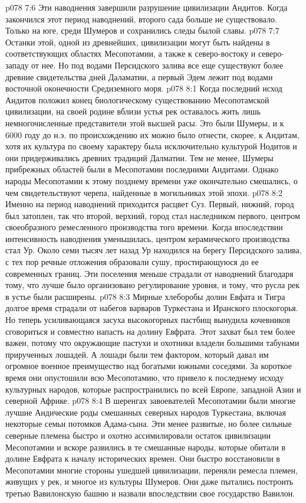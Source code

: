 \vs p078 7:6 \pc Эти наводнения завершили разрушение цивилизации Андитов. Когда закончился этот период наводнений, второго сада больше не существовало. Только на юге, среди Шумеров и сохранились следы былой славы.
\vs p078 7:7 Останки этой, одной из древнейших, цивилизации могут быть найдены в соответствующих областях Месопотамии, а также к северо\hyp{}востоку и северо\hyp{}западу от нее. Но под водами Персидского залива все еще существуют более древние свидетельства дней Даламатии, а первый Эдем лежит под водами восточной оконечности Средиземного моря.
\vs p078 8:1 Когда последний исход Андитов положил конец биологическому существованию Месопотамской цивилизации, на своей родине вблизи устья рек оставалось жить лишь немногочисленные представители этой высшей расы. Это были Шумеры, и к 6000 году до н.э. по происхождению их можно было отнести, скорее, к Андитам, хотя их культура по своему характеру была исключительно культурой Нодитов и они придерживались древних традиций Далматии. Тем не менее, Шумеры прибрежных областей были в Месопотамии последними Андитами. Однако народы Месопотамии к этому позднему времени уже окончательно смешались, о чем свидетельствуют черепа, найденные в могильниках этой эпохи.
\vs p078 8:2 Именно на период наводнений приходится расцвет Суз. Первый, нижний, город был затоплен, так что второй, верхний, город стал наследником первого, центром своеобразного ремесленного производства того времени. Когда впоследствии интенсивность наводнения уменьшилась, центром керамического производства стал Ур. Около семи тысяч лет назад Ур находился на берегу Персидского залива, с тех пор речные отложения образовали сушу, простирающуюся до ее современных границ. Эти поселения меньше страдали от наводнений благодаря тому, что лучше было организовано регулирование уровня, и тому, что русла рек в устье были расширены.
\vs p078 8:3 \pc Мирные хлеборобы долин Евфата и Тигра долгое время страдали от набегов варваров Туркестана и Иранского плоскогорья. Но теперь усиливающаяся засуха высокогорных пастбищ вынудила кочевников сговориться и совместно напасть на долину Евфрата. Этот захват был тем более важен, потому что окружающие пастухи и охотники владели большими табунами прирученных лошадей. А лошади были тем фактором, который давал им огромное военное преимущество над богатыми южными соседями. За короткое время они опустошили всю Месопотамию, что привело к последнему исходу культурных народов, которые распространились по всей Европе, западной Азии и северной Африке.
\vs p078 8:4 В шеренгах завоевателей Месопотамии были многие лучшие Андические роды смешанных северных народов Туркестана, включая некоторые семьи потомков Адама\hyp{}сына. Эти менее развитые, но более сильные северные племена быстро и охотно ассимилировали остаток цивилизации Месопотамии и вскоре развились в те смешанные народы, которые обитали в долине Евфрата к началу исторических времен. Они быстро восстановили в Месопотамии многие стороны ушедшей цивилизации, переняли ремесла племен, живущих у рек, и многое из культуры Шумеров. Они даже пытались построить третью Вавилонскую башню и назвали впоследствии свое государство Вавилон.
